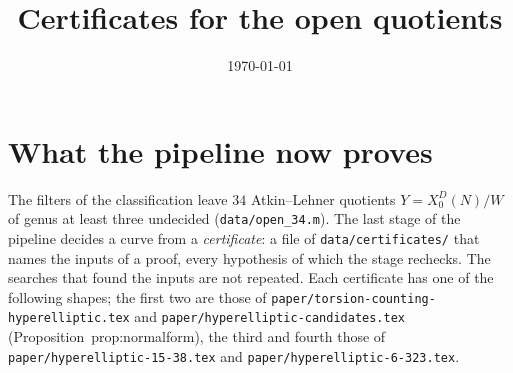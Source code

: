 \documentclass[11pt,reqno]{amsart}
\theoremstyle{plain}
\theoremstyle{definition}
\begin{document}
\title{Certificates for the open quotients}
\author{}
\date{\today}
\maketitle

\section{What the pipeline now proves}

The filters of the classification leave $34$ Atkin--Lehner quotients $Y=X_0^D(N)/W$ of genus at least three
undecided (\texttt{data/open\_34.m}). The last stage of the pipeline decides a curve from a \emph{certificate}: a
file of \texttt{data/certificates/} that names the inputs of a proof, every hypothesis of which the stage
rechecks. The searches that found the inputs are not repeated. Each certificate has one of the following
shapes; the first two are those of \texttt{paper/torsion-counting-hyperelliptic.tex} and
\texttt{paper/hyperelliptic-candidates.tex} (Proposition~prop:normalform), the third and fourth those of
\texttt{paper/hyperelliptic-15-38.tex} and \texttt{paper/hyperelliptic-6-323.tex}.
\end{document}
